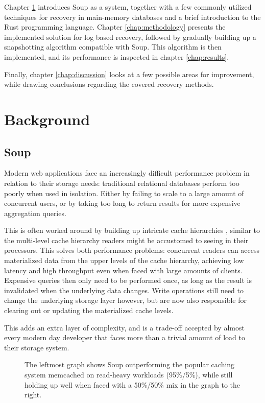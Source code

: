 \documentclass[b5paper]{report}
\begin{document}
Chapter \ref{chap:background} introduces Soup as a system, together with a few
commonly utilized techniques for recovery in main-memory databases and a brief
introduction to the Rust programming language. Chapter \ref{chap:methodology}
presents the implemented solution for log based recovery, followed by gradually
building up a snapshotting algorithm compatible with Soup. This algorithm is
then implemented, and its performance is inspected in chapter
\ref{chap:results}.

Finally, chapter \ref{chap:discussion} looks at a few possible areas for
improvement, while drawing conclusions regarding the covered recovery methods.

\chapter{Background} \label{chap:background}
\section{Soup}
Modern web applications face an increasingly difficult performance problem in
relation to their storage needs: traditional relational databases perform too
poorly when used in isolation. Either by failing to scale to a large amount of
concurrent users, or by taking too long to return results for more expensive
aggregation queries.

This is often worked around by building up intricate cache hierarchies
\cite{memcached}, similar to the multi-level cache hierarchy readers might be
accustomed to seeing in their processors. This solves both performance problems:
concurrent readers can access materialized data from the upper levels of the
cache hierarchy, achieving low latency and high throughput even when faced with
large amounts of clients. Expensive queries then only need to be performed once,
as long as the result is invalidated when the underlying data changes. Write
operations still need to change the underlying storage layer however, but are
now also responsible for clearing out or updating the materialized cache levels.

This adds an extra layer of complexity, and is a trade-off accepted by almost
every modern day developer that faces more than a trivial amount of load to
their storage system.

\begin{figure}[H]
  \centering
  
  \caption{
    The leftmost graph shows Soup outperforming the popular caching system
    memcached on read-heavy workloads (95\%/5\%), while still holding up well
    when faced with a 50\%/50\% mix in the graph to the right.
  }
\end{figure}
\end{document}
